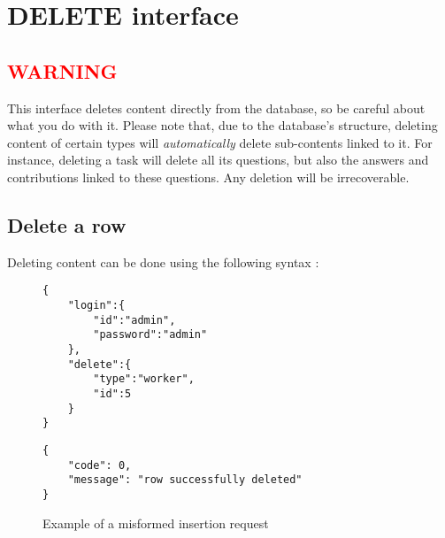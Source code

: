 \documentclass[notitlepage]{report}
\begin{document}
\chapter{DELETE interface}
\section{\textcolor{red}{WARNING}}
This interface deletes content directly from the database, so be careful about what you do with it. Please note that, due to the database's structure, deleting content of certain types will \emph{automatically} delete sub-contents linked to it. For instance, deleting a task will delete all its questions, but also the answers and contributions linked to these questions. Any deletion will be irrecoverable. 
\section{Delete a row}
Deleting content can be done using the following syntax :
\begin{figure}[h]
\centering
\begin{minipage}{.45\linewidth}
\begin{verbatim}
{
    "login":{   
        "id":"admin",
        "password":"admin"
    },
    "delete":{
        "type":"worker",
        "id":5
    }
}
\end{verbatim}
\end{minipage}
\begin{minipage}{.45\linewidth}
\begin{verbatim}
{
    "code": 0,
    "message": "row successfully deleted"
}
\end{verbatim}
\end{minipage}
\caption{Example of a misformed insertion request}
\end{figure}
\end{document}
